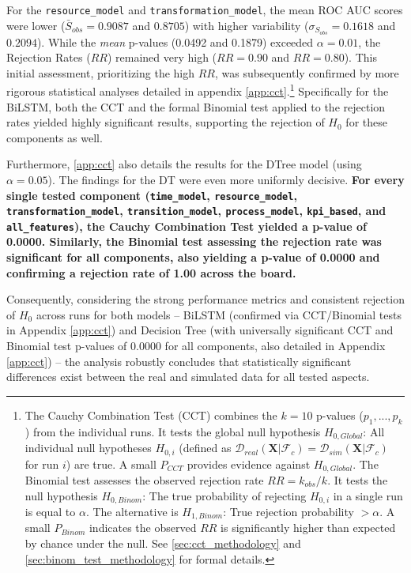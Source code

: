 For the \texttt{resource\_model} and \texttt{transformation\_model}, the mean ROC AUC scores were lower ($\bar{S}_{obs}=0.9087$ and $0.8705$) with higher variability ($\sigma_{S_{obs}}=0.1618$ and $0.2094$). While the \textit{mean} p-values (0.0492 and 0.1879) exceeded $\alpha=0.01$, the Rejection Rates ($RR$) remained very high ($RR=0.90$ and $RR=0.80$). This initial assessment, prioritizing the high $RR$, was subsequently confirmed by more rigorous statistical analyses detailed in appendix \autoref{app:cct}.\footnote{The Cauchy Combination Test (CCT) combines the $k=10$ p-values ($p_1, ..., p_k$) from the individual runs. It tests the global null hypothesis $H_{0,Global}$: All individual null hypotheses $H_{0,i}$ (defined as $\mathcal{D}_{real}(\mathbf{X} | \mathcal{F}_c) = \mathcal{D}_{sim}(\mathbf{X} | \mathcal{F}_c)$ for run $i$) are true. A small $P_{CCT}$ provides evidence against $H_{0,Global}$. The Binomial test assesses the observed rejection rate $RR = k_{obs}/k$. It tests the null hypothesis $H_{0,Binom}$: The true probability of rejecting $H_{0,i}$ in a single run is equal to $\alpha$. The alternative is $H_{1,Binom}$: True rejection probability $> \alpha$. A small $P_{Binom}$ indicates the observed $RR$ is significantly higher than expected by chance under the null. See \autoref{sec:cct_methodology} and \autoref{sec:binom_test_methodology} for formal details.} Specifically for the BiLSTM, both the CCT and the formal Binomial test applied to the rejection rates yielded highly significant results, supporting the rejection of $H_0$ for these components as well.

Furthermore, \autoref{app:cct} also details the results for the DTree model (using $\alpha = 0.05$). The findings for the DT were even more uniformly decisive. \textbf{For every single tested component (\texttt{time\_model}, \texttt{resource\_model}, \texttt{transformation\_model}, \texttt{transition\_model}, \texttt{process\_model}, \texttt{kpi\_based}, and \texttt{all\_features}), the Cauchy Combination Test yielded a p-value of 0.0000. Similarly, the Binomial test assessing the rejection rate was significant for all components, also yielding a p-value of 0.0000 and confirming a rejection rate of 1.00 across the board.}

Consequently, considering the strong performance metrics and consistent rejection of $H_0$ across runs for both models – BiLSTM (confirmed via CCT/Binomial tests in Appendix \ref{app:cct}) and Decision Tree (with universally significant CCT and Binomial test p-values of 0.0000 for all components, also detailed in Appendix \ref{app:cct}) – the analysis robustly concludes that statistically significant differences exist between the real and simulated data for all tested aspects.

